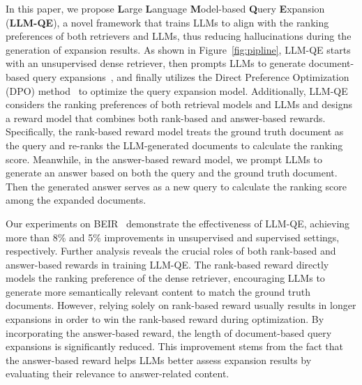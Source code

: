 In this paper, we propose \textbf{L}arge \textbf{L}anguage \textbf{M}odel-based \textbf{Q}uery \textbf{E}xpansion (\textbf{LLM-QE}), a novel framework that trains LLMs to align with the ranking preferences of both retrievers and LLMs, thus reducing hallucinations during the generation of expansion results. As shown in Figure~\ref{fig:pipline}, LLM-QE starts with an unsupervised dense retriever, then prompts LLMs to generate document-based query expansions~\cite{gao2023precise,wang2023query2doc}, and finally utilizes the Direct Preference Optimization (DPO) method~\cite{rafailov2023direct} to optimize the query expansion model. Additionally, LLM-QE considers the ranking preferences of both retrieval models and LLMs and designs a reward model that combines both rank-based and answer-based rewards. Specifically, the rank-based reward model treats the ground truth document as the query and re-ranks the LLM-generated documents to calculate the ranking score. Meanwhile, in the answer-based reward model, we prompt LLMs to generate an answer based on both the query and the ground truth document. Then the generated answer serves as a new query to calculate the ranking score among the expanded documents.


Our experiments on BEIR~\cite{thakur2021beir} demonstrate the effectiveness of LLM-QE, achieving more than 8\% and 5\% improvements in unsupervised and supervised settings, respectively. Further analysis reveals the crucial roles of both rank-based and answer-based rewards in training LLM-QE. The rank-based reward directly models the ranking preference of the dense retriever, encouraging LLMs to generate more semantically relevant content to match the ground truth documents. However, relying solely on rank-based reward usually results in longer expansions in order to win the rank-based reward during optimization. By incorporating the answer-based reward, the length of document-based query expansions is significantly reduced. This improvement stems from the fact that the answer-based reward helps LLMs better assess expansion results by evaluating their relevance to answer-related content.




